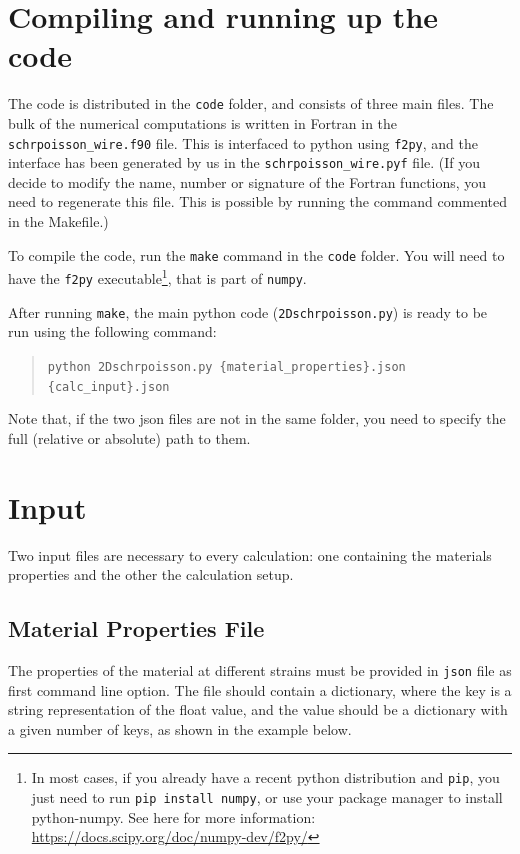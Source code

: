 \documentclass[a4paper,12pt]{article}
\begin{document}
\section{Compiling and running up the code}
The code is distributed in the \texttt{code} folder, and consists of three main files.
The bulk of the numerical computations is written in Fortran in the  \texttt{schrpoisson\_wire.f90} file. This is interfaced to python using \texttt{f2py}, and the interface has been generated by us in the \texttt{schrpoisson\_wire.pyf} file. (If you decide to modify the name, number or signature of the Fortran functions, you need to regenerate this file. This is possible by running the command commented in the Makefile.)

To compile the code, run the \texttt{make} command in the \texttt{code} folder.
You will need to have the \texttt{f2py} executable\footnote{In most cases, if you already have a recent python distribution and \texttt{pip}, you just need to run \texttt{pip install numpy}, or use your package manager to install python-numpy. See here for more information: \url{https://docs.scipy.org/doc/numpy-dev/f2py/}}, that is part of \texttt{numpy}. 

After running \texttt{make}, the main python code (\texttt{2Dschrpoisson.py}) is ready to be run using the following command:

\begin{quote}
\texttt{python 2Dschrpoisson.py \{material\_properties\}.json  \{calc\_input\}.json}
\end{quote}

Note that, if the two json files are not in the same folder, you need to specify the full (relative or absolute) path to them.

\section{\label{sec:input}Input}
Two input files are necessary to every calculation: one containing the materials properties and the other the calculation setup. 

\subsection{Material Properties File}
The properties of the material at different strains must be provided in \texttt{json} file as first command line option. 
The file should contain a dictionary, where the key is a string representation of the
float value, and the value should be a dictionary with a given number of keys, as shown in
the example below.
\end{document}
